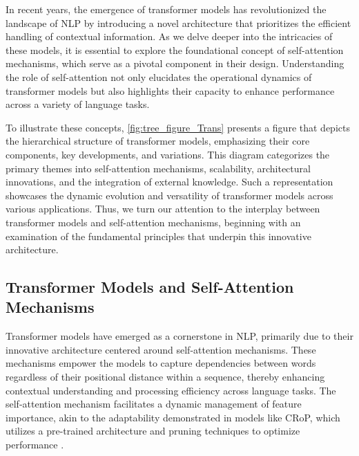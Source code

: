 In recent years, the emergence of transformer models has revolutionized the landscape of NLP by introducing a novel architecture that prioritizes the efficient handling of contextual information. As we delve deeper into the intricacies of these models, it is essential to explore the foundational concept of self-attention mechanisms, which serve as a pivotal component in their design. Understanding the role of self-attention not only elucidates the operational dynamics of transformer models but also highlights their capacity to enhance performance across a variety of language tasks. 

To illustrate these concepts, \autoref{fig:tree_figure_Trans} presents a figure that depicts the hierarchical structure of transformer models, emphasizing their core components, key developments, and variations. This diagram categorizes the primary themes into self-attention mechanisms, scalability, architectural innovations, and the integration of external knowledge. Such a representation showcases the dynamic evolution and versatility of transformer models across various applications. Thus, we turn our attention to the interplay between transformer models and self-attention mechanisms, beginning with an examination of the fundamental principles that underpin this innovative architecture.











\subsection{Transformer Models and Self-Attention Mechanisms} \label{subsec:Transformer Models and Self-Attention Mechanisms}

Transformer models have emerged as a cornerstone in NLP, primarily due to their innovative architecture centered around self-attention mechanisms. These mechanisms empower the models to capture dependencies between words regardless of their positional distance within a sequence, thereby enhancing contextual understanding and processing efficiency across language tasks. The self-attention mechanism facilitates a dynamic management of feature importance, akin to the adaptability demonstrated in models like CRoP, which utilizes a pre-trained architecture and pruning techniques to optimize performance \cite{kaur2024cropcontextwiserobuststatic}.

